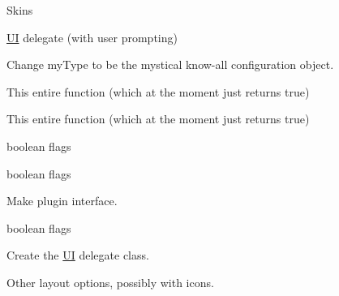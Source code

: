 
\begin{DoxyRefList}
\item[\label{todo__todo000008}%
\hypertarget{todo__todo000008}{}%
Class \hyperlink{class_a_w_e_1_1_global_settings}{A\-W\-E\-:\-:Global\-Settings} ]Skins 

\hyperlink{namespace_u_i}{U\-I} delegate (with user prompting) 
\item[\label{todo__todo000002}%
\hypertarget{todo__todo000002}{}%
Class \hyperlink{class_a_w_e_1_1_j_s_o_n_scraper}{A\-W\-E\-:\-:J\-S\-O\-N\-Scraper} ]Change {\ttfamily my\-Type} to be the mystical know-\/all configuration object. 
\item[\label{todo__todo000006}%
\hypertarget{todo__todo000006}{}%
Member \hyperlink{class_a_w_e_1_1_j_s_o_n_scraper_ac73167b683a6dec42cd84211e337dc46}{A\-W\-E\-:\-:J\-S\-O\-N\-Scraper\-:\-:check\-Procedure\-Validity} (\hyperlink{class_json_1_1_value}{Json\-::\-Value} \&procedure, int cap\-Count)]This entire function (which at the moment just returns {\ttfamily true}) 
\item[\label{todo__todo000005}%
\hypertarget{todo__todo000005}{}%
Member \hyperlink{class_a_w_e_1_1_j_s_o_n_scraper_ac83bcfb3d69108024c23ff49e8b8c274}{A\-W\-E\-:\-:J\-S\-O\-N\-Scraper\-:\-:check\-Validity} ()]This entire function (which at the moment just returns {\ttfamily true}) 
\item[\label{todo__todo000003}%
\hypertarget{todo__todo000003}{}%
Member \hyperlink{class_a_w_e_1_1_j_s_o_n_scraper_a883ec1b6814b4f192a28f32c8f47dd39}{A\-W\-E\-:\-:J\-S\-O\-N\-Scraper\-:\-:scrape\-Data\-For\-File} (Media\-Item $\ast$file, bool ask\-User, bool import, bool inherit\-Metadata)]boolean flags 
\item[\label{todo__todo000004}%
\hypertarget{todo__todo000004}{}%
Member \hyperlink{class_a_w_e_1_1_j_s_o_n_scraper_a1ccab4a9c36f8420222a75de1282eb2f}{A\-W\-E\-:\-:J\-S\-O\-N\-Scraper\-:\-:scrape\-Data\-For\-File} (Folder $\ast$place\-In\-Me, Global\-Settings $\ast$global\-Settings, Q\-Dir file, bool ask\-User, bool import, bool inherit\-Metadata)]boolean flags 
\item[\label{todo__todo000001}%
\hypertarget{todo__todo000001}{}%
Class \hyperlink{class_a_w_e_1_1_media_player}{A\-W\-E\-:\-:Media\-Player} ]Make plugin interface.  
\item[\label{todo__todo000007}%
\hypertarget{todo__todo000007}{}%
Member \hyperlink{class_a_w_e_1_1_metadata_scraper_af3708cc05181299d7c5b37afc1568b3d}{A\-W\-E\-:\-:Metadata\-Scraper\-:\-:scrape\-Data\-For\-File} (Folder $\ast$place\-In\-Me, Global\-Settings $\ast$global\-Settings, Q\-Dir file, bool ask\-User, bool import, bool inherit\-Metadata)=0]boolean flags 
\item[\label{todo__todo000009}%
\hypertarget{todo__todo000009}{}%
Namespace \hyperlink{namespace_u_i}{U\-I} ]Create the \hyperlink{namespace_u_i}{U\-I} delegate class.  
\item[\label{todo__todo000010}%
\hypertarget{todo__todo000010}{}%
Class \hyperlink{class_u_i_1_1_folder_pane}{U\-I\-:\-:Folder\-Pane} ]Other layout options, possibly with icons. 
\end{DoxyRefList}